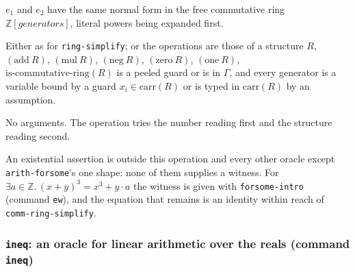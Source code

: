 \label{kop:comm-ring-simplify}%
\begin{VNBcond}
\item[Normal form] $e_1$ and $e_2$ have the same normal form in the
  free commutative ring $\mathbb{Z}[\textit{generators}]$, literal
  powers being expanded first.
\item[Typing] Either as for \texttt{ring-simplify}; or the operations
  are those of a structure $R$, $(\mathrm{add}\ R)$, $(\mathrm{mul}\ R)$,
  $(\mathrm{neg}\ R)$, $(\mathrm{zero}\ R)$, $(\mathrm{one}\ R)$,
  $\mathrm{is\text{-}commutative\text{-}ring}(R)$ is a peeled guard or is
  in $\Gamma$, and every generator is a variable bound by a guard
  $x_i \in \mathrm{carr}(R)$ or is typed in $\mathrm{carr}(R)$ by an
  assumption.
\end{VNBcond}
No arguments.  The operation tries the number reading first and the
structure reading second.

An existential assertion is outside this operation and every other
oracle except \texttt{arith-forsome}'s one shape: none of them supplies a
witness.  For $\exists a \in \mathbb{Z}.\, (x+y)^3 = x^3 + y \cdot a$ the
witness is given with \texttt{forsome-intro} (command \texttt{ew}), and
the equation that remains is an identity within reach of
\texttt{comm-ring-simplify}.

\subsubsection*{\texttt{ineq}: an oracle for linear arithmetic over the reals
  (command \texttt{ineq})}

